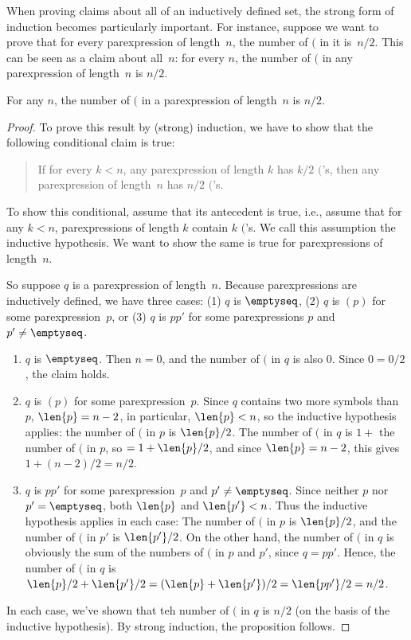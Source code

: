 \documentclass[../../../include/open-logic-section]{subfiles}
\begin{document}
When proving claims about all of an inductively defined set, the
strong form of induction becomes particularly important. For instance,
suppose we want to prove that for every parexpression of length~$n$,
the number of $($ in it is~$n/2$.  This can be seen as a claim about
all~$n$: for every $n$, the number of $($ in any parexpression of
length~$n$ is $n/2$.

\begin{prop}
  For any $n$, the number of $($ in a parexpression of length~$n$ is
  $n/2$.
\end{prop}

\begin{proof}
To prove this result by (strong) induction, we have to show that the
following conditional claim is true:
\begin{quote}
  If for every $k < n$, any parexpression of length $k$ has $k/2$
  $($'s, then any parexpression of length~$n$ has $n/2$ $($'s.
\end{quote}
To show this conditional, assume that its antecedent is true, i.e.,
assume that for any $k<n$, parexpressions of length $k$ contain $k$
$($'s.  We call this assumption the inductive hypothesis. We want to
show the same is true for parexpressions of length~$n$.

So suppose $q$ is a parexpression of length~$n$.  Because
parexpressions are inductively defined, we have three cases: (1) $q$
is $\emptyseq$, (2) $q$ is $(p)$ for some parexpression~$p$, or (3)
$q$ is $pp'$ for some parexpressions $p$ and $p' \neq \emptyseq$.
\begin{enumerate}
\item $q$ is $\emptyseq$.  Then $n = 0$, and the number of $($ in
$q$ is also $0$. Since $0 = 0/2$, the claim holds.
\item $q$ is $(p)$ for some parexpression~$p$.  Since $q$ contains two
  more symbols than $p$, $\len{p} = n - 2$, in particular, $\len{p} <
  n$, so the inductive hypothesis applies: the number of $($ in $p$ is
  $\len{p}/2$. The number of $($ in $q$ is $1 + {}$ the number of $($
  in $p$, so $= 1 + \len{p}/2$, and since $\len{p} = n - 2$, this
  gives $1 + (n-2)/2 = n/2$.
\item $q$ is $pp'$ for some parexpression~$p$ and $p' \neq \emptyseq$.
  Since neither $p$ nor $p' =\emptyseq$, both $\len{p}$ and $\len{p'}
  < n$. Thus the inductive hypothesis applies in each case: The number
  of $($ in $p$ is $\len{p}/2$, and the number of $($ in $p'$ is
  $\len{p'}/2$.  On the other hand, the number of $($ in $q$ is
  obviously the sum of the numbers of $($ in $p$ and $p'$, since $q =
  pp'$.  Hence, the number of $($ in $q$ is $\len{p}/2 + \len{p'}/2 =
  (\len{p}+\len{p'})/2 = \len{pp'}/2 = n/2$.
\end{enumerate}
In each case, we've shown that teh number of $($ in $q$ is $n/2$ (on
the basis of the inductive hypothesis). By strong induction, the
proposition follows.
\end{proof}
\end{document}
